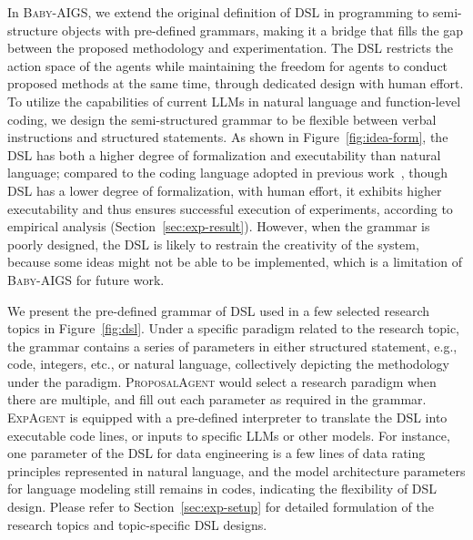 \documentclass{article} %
\newcommand{\AIGSSys}{\textsc{Baby-AIGS}\xspace}
\newcommand{\ProposalAgent}{\textsc{ProposalAgent}\xspace}
\newcommand{\ExperimentAgent}{\textsc{ExpAgent}\xspace}
\newcommand{\DSL}{\textsc{DSL}\xspace}
\begin{document}
In \AIGSSys, we extend the original definition of \DSL in programming to semi-structure objects with pre-defined grammars, making it a bridge that fills the gap between the proposed methodology and experimentation. The \DSL restricts the action space of the agents while maintaining the freedom for agents to conduct proposed methods at the same time, through dedicated design with human effort. To utilize the capabilities of current LLMs in natural language and function-level coding, we design the semi-structured grammar to be flexible between verbal instructions and structured statements. As shown in Figure~\ref{fig:idea-form}, the \DSL has both a higher degree of formalization and executability than natural language; compared to the coding language adopted in previous work~\citep{lu2024aiscientist}, though \DSL has a lower degree of formalization, with human effort, it exhibits higher executability and thus ensures successful execution of experiments, according to empirical analysis (Section~\ref{sec:exp-result}). However, when the grammar is poorly designed, the \DSL is likely to restrain the creativity of the system, because some ideas might not be able to be implemented, which is a limitation of \AIGSSys for future work. 

 We present the pre-defined grammar of \DSL used in a few selected research topics in Figure~\ref{fig:dsl}. Under a specific paradigm related to the research topic, the grammar contains a series of parameters in either structured statement, e.g., code, integers, etc., or natural language, collectively depicting the methodology under the paradigm. \ProposalAgent would select a research paradigm when there are multiple, and fill out each parameter as required in the grammar. \ExperimentAgent is equipped with a pre-defined interpreter to translate the \DSL into executable code lines, or inputs to specific LLMs or other models. For instance, one parameter of the \DSL for data engineering is a few lines of data rating principles represented in natural language, and the model architecture parameters for language modeling still remains in codes, indicating the flexibility of \DSL design. Please refer to Section~\ref{sec:exp-setup} for detailed formulation of the research topics and topic-specific \DSL designs. 
\end{document}
